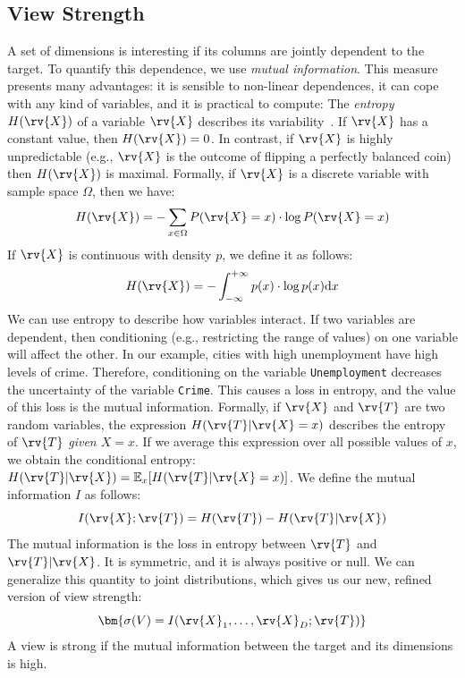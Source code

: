 \subsection{View Strength}
\label{sec:view-strength}
A set of dimensions is interesting if its columns are jointly dependent to the
target. To quantify this dependence, we use \emph{mutual information}. This
measure presents many advantages: it is sensible to non-linear dependences, it
can cope with any kind of variables, and it is practical to compute:
The \emph{entropy} $H(\rv{X})$ of a variable $\rv{X}$ describes its
variabi\-lity~\cite{cover2012elements}. If $\rv{X}$ has a constant value, then $H(\rv{X}) = 0$.
In contrast, if $\rv{X}$ is highly unpredictable (e.g., $\rv{X}$ is
the outcome of flipping a perfectly balanced coin) then $H(\rv{X})$ is
maximal. Formally, if $\rv{X}$ is a discrete variable with sample space
$\Omega$, then we have:
\begin{equation}\label{eq:ent-disc}
    H(\rv{X}) = - \sum_{x\in \Omega} P(\rv{X} = x) \cdot \log{P(\rv{X} = x)}
\end{equation}
If $\rv{X}$ is continuous with density $p$, we define it as follows:
\begin{equation}\label{eq:ent-cont}
    H(\rv{X}) = - \int_{-\infty}^{+\infty} p(x) \cdot \log{p(x)}\mathrm{d}x
\end{equation}
We can use entropy to describe how variables interact. If two variables are
dependent, then conditioning (e.g., restricting the range of values) on one
variable will affect the other. In our example, cities with high unemployment
have high levels of crime.  Therefore, conditioning on the variable
\texttt{Unemployment} decreases the uncertainty of the variable
\texttt{Crime}. This causes a loss in entropy, and the value of this loss is
the mutual information.  Formally, if $\rv{X}$ and $\rv{T}$ are two
random variables, the expression $H(\rv{T} | \rv{X} = x)$ describes the entropy
of $\rv{T}$ \emph{given $X = x$}. If we average this expression over all
possible values of $x$, we obtain the conditional entropy: $H(\rv{T}|\rv{X}) =
\mathbb{E}_{x} [H(\rv{T} | \rv{X} = x)]$. We define the mutual information $I$
as follows:
\begin{equation}\label{eq:mut-inf}
    I(\rv{X}; \rv{T}) = H(\rv{T}) - H(\rv{T} | \rv{X})
\end{equation}
The mutual information is the loss in entropy between $\rv{T}$ and $\rv{T} |
\rv{X}$. It is symmetric, and it is always positive or null. We can generalize
this quantity to joint distributions, which gives us our new, refined version of
view strength:
\begin{equation}\label{eq:strength}\bm{
    \sigma(V) = I(\rv{X}_1, \ldots, \rv{X}_D ; \rv{T})
}\end{equation}
A view is strong if the mutual information between the target and its
dimensions is high.

